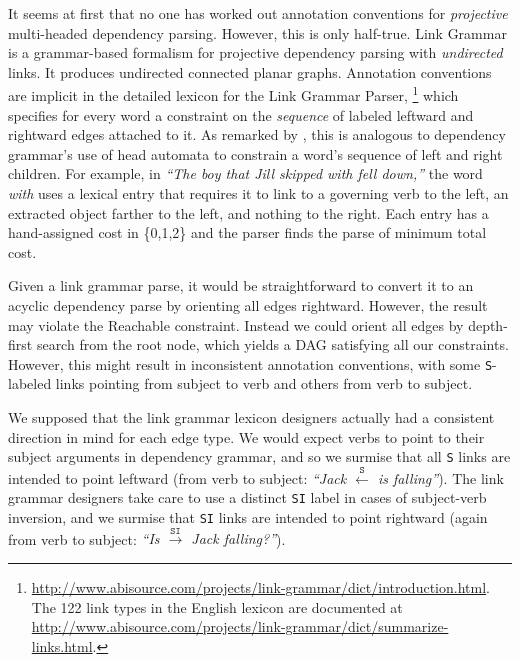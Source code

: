 \documentclass[a4paper,11pt]{article}
\newcommand{\Note}[4][]{\todo[author=#2,color=#3,fancyline,#1]{#4}}
\newcommand{\noteJE}[2][]{\Note[#1]{JE}{green!40}{#2}}
\begin{document}
It seems at first that no one has worked out annotation conventions for {\em projective} multi-headed dependency parsing.  However, this is only half-true.  Link Grammar \cite{SleatorTemperly91} is a grammar-based formalism for projective dependency parsing with {\em undirected} links.  It produces undirected connected planar graphs.  Annotation conventions are implicit in the detailed lexicon for the Link Grammar Parser,\noteJE{check caps}%
\footnote{\url{http://www.abisource.com/projects/link-grammar/dict/introduction.html}.  The 122 link types in the English lexicon are documented at \url{http://www.abisource.com/projects/link-grammar/dict/summarize-links.html}.} 
which specifies for every word a constraint on the {\em sequence} of labeled leftward and rightward edges attached to it.  As remarked by \cite{eisner-2000-iwptbook}, this is analogous to dependency grammar's use of head automata to constrain a word's sequence of left and right children.  For example, in {\em ``The boy that Jill skipped with fell down,''} the word {\em with} uses a lexical entry that requires it to link to a governing verb to the left, an extracted object farther to the left, and nothing to the right.  Each entry has a hand-assigned cost in \{0,1,2\} and the parser finds the parse of minimum total cost.

Given a link grammar parse, it would be straightforward to convert it to an acyclic dependency parse by orienting all edges rightward.  However, the result may violate the {\sc Reachable} constraint.  Instead we could orient all edges by depth-first search from the root node, which yields a DAG satisfying all our constraints.  However, this might result in inconsistent annotation conventions, with some \texttt{S}-labeled links pointing from subject to verb and others from verb to subject.  

We supposed that the link grammar lexicon designers actually had a consistent direction in mind for each edge type.  We would expect verbs to point to their subject arguments in dependency grammar, and so we surmise that all \texttt{S} links are intended to point leftward (from verb to subject: {\em ``Jack $\stackrel{\texttt{S}}{\leftarrow}$ is falling''}).  The link grammar designers take care to use a distinct \texttt{SI} label in cases of subject-verb inversion, and we surmise that \texttt{SI} links are intended to point rightward (again from verb to subject: {\em ``Is $\stackrel{\texttt{SI}}{\rightarrow}$ Jack falling?''}).
\end{document}
